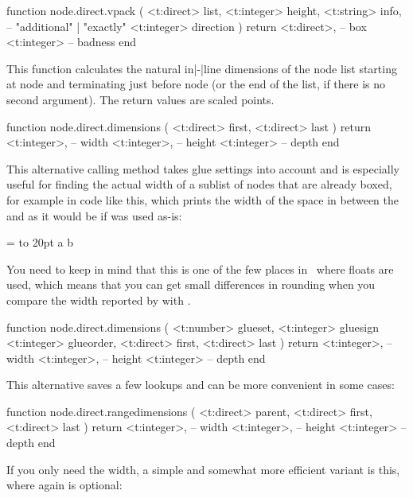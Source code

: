 function node.direct.vpack (
    <t:direct>  list,
    <t:integer> height,
    <t:string>  info, -- "additional" | "exactly"
    <t:integer> direction
)
    return
        <t:direct>, -- box
        <t:integer> -- badness
end
\stoptyping

This function calculates the natural in|-|line dimensions of the node list starting
at node  and terminating just before node  (or the end of the
list, if there is no second argument). The return values are scaled points.

\starttyping[option=LUA]
function node.direct.dimensions (
    <t:direct> first,
    <t:direct> last
)
    return
        <t:integer>, -- width
        <t:integer>, -- height
        <t:integer>  -- depth
end
\stoptyping

This alternative calling method takes glue settings into account and is especially useful for
finding the actual width of a sublist of nodes that are already boxed, for
example in code like this, which prints the width of the space in between the
 and  as it would be if  was used as-is:

\starttyping
{} = \hbox to 20pt {a b}

\stoptyping

You need to keep in mind that this is one of the few places in \TEX\ where floats
are used, which means that you can get small differences in rounding when you
compare the width reported by  with .

\starttyping[option=LUA]
function node.direct.dimensions (
    <t:number>  glueset,
    <t:integer> gluesign
    <t:integer> glueorder,
    <t:direct>  first,
    <t:direct>  last
)
    return
        <t:integer>, -- width
        <t:integer>, -- height
        <t:integer>  -- depth
end
\stoptyping

This alternative saves a few lookups and can be more convenient in some
cases:

\starttyping[option=LUA]
function node.direct.rangedimensions (
    <t:direct> parent,
    <t:direct> first,
    <t:direct> last
)
    return
        <t:integer>, -- width
        <t:integer>, -- height
        <t:integer>  -- depth
end
\stoptyping

If you only need the width, a simple and somewhat more efficient variant is this,
where again  is optional:

